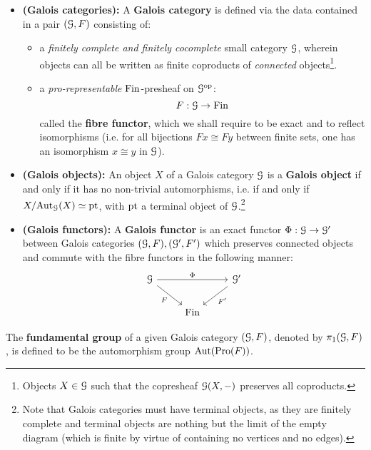             \begin{definition} \label{def: galois_categories}
                \noindent
                \begin{itemize}
                    \item \textbf{(Galois categories):} A \textbf{Galois category} is defined via the data contained in a pair $(\mathcal{G}, F)$ consisting of:
                    \begin{itemize}
                        \item a \textit{finitely complete and finitely cocomplete} small category $\mathcal{G}$, wherein objects can all be written as finite coproducts of \textit{connected} objects\footnote{Objects $X \in \mathcal{G}$ such that the copresheaf $\mathcal{G}(X, -)$ preserves all coproducts.}.
                        \item a \textit{pro-representable} $\mathrm{Fin}$-presheaf on $\mathcal{G}^{\mathrm{op}}$:
                            $$F: \mathcal{G} \to \mathrm{Fin}$$
                        called the \textbf{fibre functor}, which we shall require to be exact and to reflect isomorphisms (i.e. for all bijections $Fx \cong Fy$ between finite sets, one has an isomorphism $x \cong y$ in $\mathcal{G}$).
                    \end{itemize}
                    \item \textbf{(Galois objects):} An object $X$ of a Galois category $\mathcal{G}$ is a \textbf{Galois object} if and only if it has no non-trivial automorphisms, i.e. if and only if $X/\mathrm{Aut}_{\mathcal{G}}(X) \simeq \mathrm{pt}$, with $\mathrm{pt}$ a terminal object of $\mathcal{G}$.\footnote{Note that Galois categories must have terminal objects, as they are finitely complete and terminal objects are nothing but the limit of the empty diagram (which is finite by virtue of containing no vertices and no edges).}
                    \item \textbf{(Galois functors):} A \textbf{Galois functor} is an exact functor $\Phi: \mathcal{G} \to \mathcal{G}'$ between Galois categories $(\mathcal{G}, F), (\mathcal{G}', F')$ which preserves connected objects and commute with the fibre functors in the following manner:
                        $$
                            \begin{tikzcd}
                            	\calG && {\calG'} \\
                            	& \Fin
                            	\arrow["F"', from=1-1, to=2-2]
                            	\arrow["{F'}", from=1-3, to=2-2]
                            	\arrow["\Phi", from=1-1, to=1-3]
                            \end{tikzcd}
                        $$
                \end{itemize}
            \end{definition}
            \begin{definition} \label{def: fundamental_groups_of_galois_categories}
                The \textbf{fundamental group} of a given Galois category $(\mathcal{G}, F)$, denoted by $\pi_1(\mathcal{G}, F)$, is defined to be the automorphism group $\mathrm{Aut}(\mathrm{Pro}(F))$.
            \end{definition}
            

